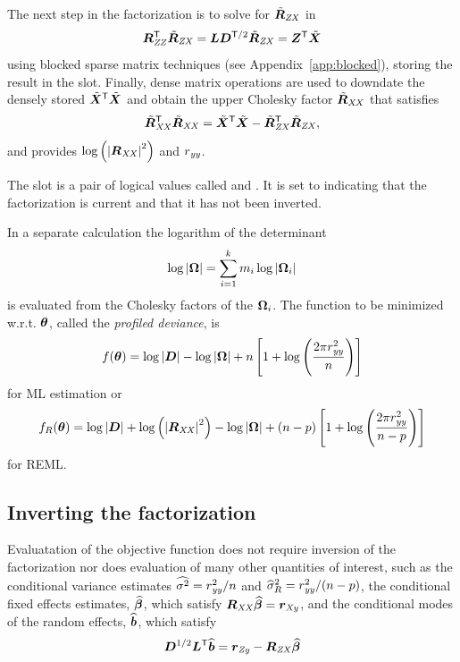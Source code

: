 \documentclass[12pt]{article}
\begin{document}
The next step in the factorization is to solve for $\tilde{\bm{R}}_\mathit{ZX}$ in
\begin{equation}
  \label{eq:RZX}
  \bm{R}_\mathit{ZZ}^\mathsf{T}\tilde{\bm{R}}_\mathit{ZX}=\bm{L}\bm{D}^{\mathsf{T}/2}\tilde{\bm{R}}_\mathit{ZX}=\bm{Z}^\mathsf{T}\tilde{\bm{X}}
\end{equation}
using blocked sparse matrix techniques (see
Appendix~\ref{app:blocked}), storing the result in the 
slot.  Finally, dense matrix operations are used to downdate the
densely stored $\tilde{\bm{X}}^\mathsf{T}\tilde{\bm{X}}$ and obtain the upper
Cholesky factor $\tilde{\bm{R}}_\mathit{XX}$ that satisfies
\begin{equation}
  \label{eq:RXX}
  \tilde{\bm{R}}_\mathit{XX}^\mathsf{T}\tilde{\bm{R}}_\mathit{XX}=
  \tilde{\bm{X}}^\mathsf{T}\tilde{\bm{X}}-\tilde{\bm{R}}_\mathit{ZX}^\mathsf{T}\tilde{\bm{R}}_\mathit{ZX} ,
\end{equation}
and provides $\log\left(\left|\bm{R}_\mathit{XX}\right|^2\right)$ and $r_\mathit{yy}$.

The  slot is a pair of logical values called
 and .  It is set to  indicating that the factorization is current and that it has
not been inverted.

In a separate calculation the logarithm of the determinant
\begin{equation}
  \label{eq:OmegaDet}
  \log |\bm{\Omega}|=\sum_{i=1}^k m_i \log |\bm{\Omega}_i|
\end{equation}
is evaluated from the Cholesky factors of the $\bm{\Omega}_i$.  The
function to be minimized w.r.t.{} $\bm{\theta}$, called the \emph{profiled
  deviance}, is
\begin{equation}
  \label{eq:ProfiledLogLik}
  f(\bm{\theta})=\log\left|\bm{D}\right|-\log\left|\bm{\Omega}\right|
  + n\left[1+\log\left(\frac{2\pi r_\mathit{yy}^2}{n}\right)\right]
\end{equation}
for ML estimation or
\begin{equation}
  \label{eq:ProfiledLogRestLik}
  f_R(\bm{\theta})=
  \log\left|\bm{D}\right|+\log\left(\left|\bm{R}_\mathit{XX}\right|^2\right)
  - \log\left|\bm{\Omega}\right|
  + (n-p)\left[1+\log\left(\frac{2\pi r_\mathit{yy}^2}{n-p}\right)\right]
\end{equation}
for REML.

\subsection{Inverting the factorization}
\label{ssec:Inverting}

Evaluatation of the objective function does not require inversion of
the factorization nor does evaluation of many other quantities of
interest, such as the conditional variance estimates
$\widehat{\sigma^2}=r_\mathit{yy}^2/n$ and $\widehat{\sigma}_R^2=r_\mathit{yy}^2/(n-p)$,
the conditional fixed effects estimates, $\widehat{\bm{\beta}}$, which satisfy
$\bm{R}_\mathit{XX}\widehat{\bm{\beta}}=\bm{r}_\mathit{Xy}$, 
and the conditional modes of
the random effects, $\widehat{\bm{b}}$, which satisfy
\begin{equation}
  \label{eq:bbhat}
  \bm{D}^{1/2}\bm{L}^\mathsf{T}\widehat{\bm{b}}=\bm{r}_\mathit{Zy}-\bm{R}_\mathit{ZX}\widehat{\bm{\beta}}
\end{equation}
\end{document}
